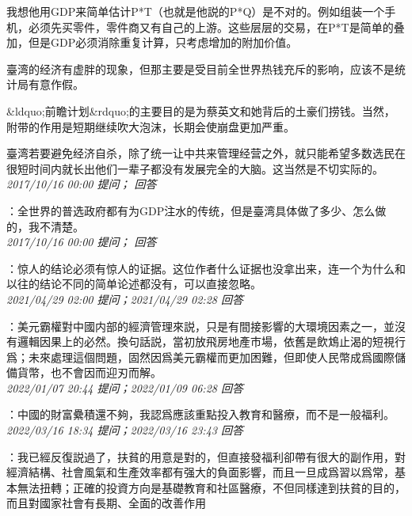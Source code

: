 \documentclass[twocolumn]{ctexart}
\begin{document}
我想他用GDP来简单估计P*T（也就是他説的P*Q）是不对的。例如组装一个手机，必须先买零件，零件商又有自己的上游。这些层层的交易，在P*T是简单的叠加，但是GDP必须消除重复计算，只考虑增加的附加价值。

臺湾的经济有虚胖的现象，但那主要是受目前全世界热钱充斥的影响，应该不是统计局有意作假。

\&ldquo;前瞻计划\&rdquo;的主要目的是为蔡英文和她背后的土豪们捞钱。当然，附带的作用是短期继续吹大泡沫，长期会使崩盘更加严重。

臺湾若要避免经济自杀，除了统一让中共来管理经营之外，就只能希望多数选民在很短时间内就长出他们一辈子都没有发展完全的大脑。这当然是不切实际的。\\

\textit{\hfill\noindent\small 2017/10/16 00:00 提问； 回答}

：全世界的普选政府都有为GDP注水的传统，但是臺湾具体做了多少、怎么做的，我不清楚。\\

\textit{\hfill\noindent\small 2017/10/16 00:00 提问； 回答}

：惊人的结论必须有惊人的证据。这位作者什么证据也没拿出来，连一个为什么和以往的结论不同的简单论述都没有，可以直接忽略。\\

\textit{\hfill\noindent\small 2021/04/29 02:00 提问；2021/04/29 02:28 回答}

：美元霸權對中國内部的經濟管理來説，只是有間接影響的大環境因素之一，並沒有邏輯因果上的必然。換句話説，當初放飛房地產市場，依舊是飲鴆止渴的短視行爲；未來處理這個問題，固然因爲美元霸權而更加困難，但即使人民幣成爲國際儲備貨幣，也不會因而迎刃而解。
\\

\textit{\hfill\noindent\small 2022/01/07 20:44 提问；2022/01/09 06:28 回答}

：中國的財富纍積還不夠，我認爲應該重點投入教育和醫療，而不是一般福利。
\\

\textit{\hfill\noindent\small 2022/03/16 18:34 提问；2022/03/16 23:43 回答}

：我已經反復説過了，扶貧的用意是對的，但直接發福利卻帶有很大的副作用，對經濟結構、社會風氣和生產效率都有强大的負面影響，而且一旦成爲習以爲常，基本無法扭轉；正確的投資方向是基礎教育和社區醫療，不但同樣達到扶貧的目的，而且對國家社會有長期、全面的改善作用
\\
\end{document}
